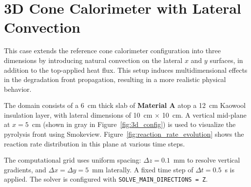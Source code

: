 \documentclass[12pt]{article}
\begin{document}
\fi


\section{3D Cone Calorimeter with Lateral Convection}

This case extends the reference cone calorimeter configuration into three dimensions by introducing natural convection on the lateral $x$ and $y$ surfaces, in addition to the top-applied heat flux. This setup induces multidimensional effects in the degradation front propagation, resulting in a more realistic physical behavior.

The domain consists of a 6~cm thick slab of \textbf{Material A} atop a 12~cm Kaowool insulation layer, with lateral dimensions of 10~cm $\times$ 10~cm. A vertical mid-plane at $x = 5$~cm (shown in gray in Figure~\ref{fig:3d_config}) is used to visualize the pyrolysis front using Smokeview. Figure~\ref{fig:reaction_rate_evolution} shows the reaction rate distribution in this plane at various time steps.

The computational grid uses uniform spacing: $\Delta z = 0.1$~mm to resolve vertical gradients, and $\Delta x = \Delta y = 5$~mm laterally. A fixed time step of $\Delta t = 0.5$~s is applied. The solver is configured with \texttt{SOLVE\_MAIN\_DIRECTIONS = Z}.

\vspace{1em}
\end{document}
